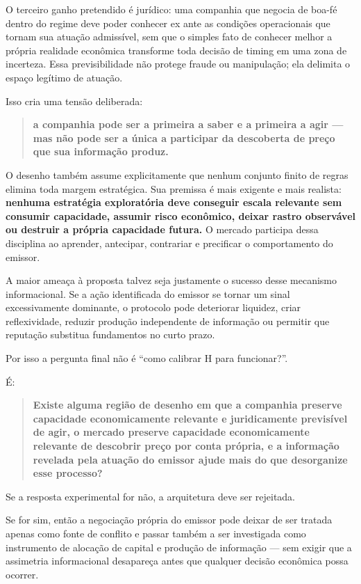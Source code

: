 \documentclass[
  a4paper,
]{article}
\begin{document}
O terceiro ganho pretendido é jurídico: uma companhia que negocia de
boa-fé dentro do regime deve poder conhecer ex ante as condições
operacionais que tornam sua atuação admissível, sem que o simples fato
de conhecer melhor a própria realidade econômica transforme toda decisão
de timing em uma zona de incerteza. Essa previsibilidade não protege
fraude ou manipulação; ela delimita o espaço legítimo de atuação.

Isso cria uma tensão deliberada:

\begin{quote}
\textbf{a companhia pode ser a primeira a saber e a primeira a agir ---
mas não pode ser a única a participar da descoberta de preço que sua
informação produz.}
\end{quote}

O desenho também assume explicitamente que nenhum conjunto finito de
regras elimina toda margem estratégica. Sua premissa é mais exigente e
mais realista: \textbf{nenhuma estratégia exploratória deve conseguir
escala relevante sem consumir capacidade, assumir risco econômico,
deixar rastro observável ou destruir a própria capacidade futura.} O
mercado participa dessa disciplina ao aprender, antecipar, contrariar e
precificar o comportamento do emissor.

A maior ameaça à proposta talvez seja justamente o sucesso desse
mecanismo informacional. Se a ação identificada do emissor se tornar um
sinal excessivamente dominante, o protocolo pode deteriorar liquidez,
criar reflexividade, reduzir produção independente de informação ou
permitir que reputação substitua fundamentos no curto prazo.

Por isso a pergunta final não é ``como calibrar H para funcionar?''.

É:

\begin{quote}
\textbf{Existe alguma região de desenho em que a companhia preserve
capacidade economicamente relevante e juridicamente previsível de agir,
o mercado preserve capacidade economicamente relevante de descobrir
preço por conta própria, e a informação revelada pela atuação do emissor
ajude mais do que desorganize esse processo?}
\end{quote}

Se a resposta experimental for não, a arquitetura deve ser rejeitada.

Se for sim, então a negociação própria do emissor pode deixar de ser
tratada apenas como fonte de conflito e passar também a ser investigada
como instrumento de alocação de capital e produção de informação --- sem
exigir que a assimetria informacional desapareça antes que qualquer
decisão econômica possa ocorrer.
\end{document}
